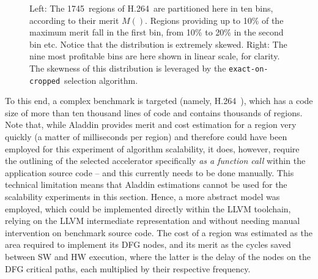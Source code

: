 \documentclass[]{usiinfthesis}
\newcommand{\htsf}{{H.264}}
\newcommand{\exactC}{\texttt{exact-on-cropped}}
\newcommand{\numofhtsfregs}{1745} %
\begin{document}
\begin{figure}[h]
\centering
  \hspace*{-2cm}
  \hspace*{-2cm}
\caption{Left: The \numofhtsfregs\ regions of \htsf\ are partitioned here
  in ten bins, according to their merit $M()$. Regions providing up to
  10\% of the maximum merit fall in the first bin, from 10\% to 20\%
  in the second bin etc. Notice that the distribution is extremely
  skewed.  Right: The nine most profitable bins are here shown in linear
  scale, for clarity.  The skewness of this distribution is leveraged
  by the \exactC\ selection algorithm.  }
\label{fig:h264-regions}
\end{figure}

To this end, a complex benchmark is targeted (namely, \htsf\
\cite{H264May15}), which has a code size of more than ten thousand
lines of code and contains thousands of regions. Note that, while
Aladdin provides merit and cost estimation for a region very quickly
(a matter of milliseconds per region) and therefore could have been
employed for this experiment of algorithm scalability, it does,
however, require the outlining of the selected accelerator
specifically \emph{as a function call} within the application source
code -- and this currently needs to be done manually. This technical
limitation means that Aladdin estimations cannot be used for the
scalability experiments in this section.
Hence, a more abstract model was employed, which could be implemented
directly within the LLVM toolchain, relying on the LLVM intermediate
representation and without needing manual intervention on benchmark
source code. The cost of a region was estimated as the area required to
implement its DFG nodes, and its merit as the cycles saved between SW
and HW execution, where the latter is the delay of the nodes on the
DFG critical paths, each multiplied by their respective frequency.\par
\end{document}
